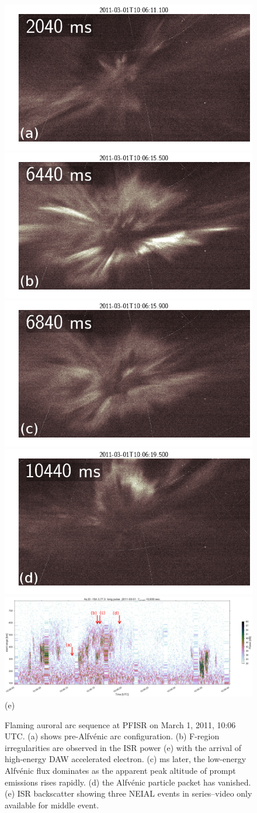 \begin{figure}\centering
    \includegraphics[width=0.19\columnwidth,trim=30 0 200 0,clip]{gfx/2011-03-01/2040}
    \includegraphics[width=0.261\columnwidth,trim=30 0 60 0,clip]{gfx/2011-03-01/6440}
    \includegraphics[width=0.261\columnwidth,trim=30 0 60 0,clip]{gfx/2011-03-01/6840}        
    \includegraphics[width=0.261\columnwidth,trim=30 0 60 0,clip]{gfx/2011-03-01/10440}
    \includegraphics[width=\columnwidth,trim=0 50 0 0]{gfx/2011-03-01/power_longpulse2011-03-0110-06-00}\\
    {\large(e)}
    \vspace{0.1cm}
    
    \caption{Flaming auroral arc sequence at PFISR on March 1, 2011, 10:06 UTC. 
        (a) shows pre-Alfvénic arc configuration. 
        (b) F-region irregularities are observed in the ISR power (e) with the arrival of high-energy DAW accelerated electron. 
        (c) \unit[400]{ms} later, the low-energy Alfvénic flux dominates as the apparent peak altitude of prompt emissions rises rapidly. 
        (d) the Alfvénic particle packet has vanished. 
        (e) ISR backscatter showing three NEIAL events in series--video only available for middle event.}
    \label{fig:20110301a}
\end{figure}

